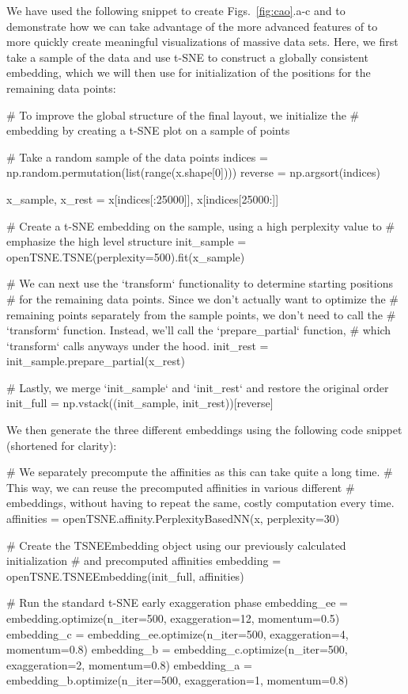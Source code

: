 \documentclass[article]{jss}
\newcommand{\opentsne}{\pkg{openTSNE}\xspace}
\begin{document}
We have used the following snippet to create Figs.~\ref{fig:cao}.a-c and to demonstrate how we can take advantage of the more advanced features of \opentsne to more quickly create meaningful visualizations of massive data sets. Here, we first take a sample of the data and use t-SNE to construct a globally consistent embedding, which we will then use for initialization of the positions for the remaining data points:
\begin{CodeChunk}
\begin{CodeInput}
# To improve the global structure of the final layout, we initialize the
# embedding by creating a t-SNE plot on a sample of points

# Take a random sample of the data points
indices = np.random.permutation(list(range(x.shape[0])))
reverse = np.argsort(indices)

x_sample, x_rest = x[indices[:25000]], x[indices[25000:]]

# Create a t-SNE embedding on the sample, using a high perplexity value to
# emphasize the high level structure
init_sample = openTSNE.TSNE(perplexity=500).fit(x_sample)

# We can next use the `transform` functionality to determine starting positions
# for the remaining data points. Since we don't actually want to optimize the
# remaining points separately from the sample points, we don't need to call the
# `transform` function. Instead, we'll call the `prepare_partial` function,
# which `transform` calls anyways under the hood.
init_rest = init_sample.prepare_partial(x_rest)

# Lastly, we merge `init_sample` and `init_rest` and restore the original order
init_full = np.vstack((init_sample, init_rest))[reverse]
\end{CodeInput}
\end{CodeChunk}
We then generate the three different embeddings using the following code snippet (shortened for clarity):
\begin{CodeChunk}
\begin{CodeInput}
# We separately precompute the affinities as this can take quite a long time.
# This way, we can reuse the precomputed affinities in various different
# embeddings, without having to repeat the same, costly computation every time.
affinities = openTSNE.affinity.PerplexityBasedNN(x, perplexity=30)

# Create the TSNEEmbedding object using our previously calculated initialization
# and precomputed affinities
embedding = openTSNE.TSNEEmbedding(init_full, affinities)

# Run the standard t-SNE early exaggeration phase
embedding_ee =    embedding.optimize(n_iter=500, exaggeration=12, momentum=0.5)
embedding_c  = embedding_ee.optimize(n_iter=500, exaggeration=4,  momentum=0.8)
embedding_b  =  embedding_c.optimize(n_iter=500, exaggeration=2,  momentum=0.8)
embedding_a  =  embedding_b.optimize(n_iter=500, exaggeration=1,  momentum=0.8)
\end{CodeInput}
\end{CodeChunk}
\end{document}
